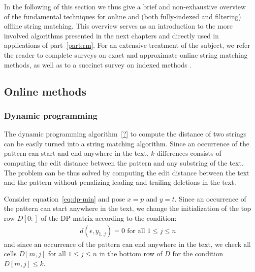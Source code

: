 In the following of this section we thus give a brief and non-exhaustive overview of the fundamental techniques for online and (both fully-indexed and filtering) offline string matching.
This overview serves as an introduction to the more involved algorithms presented in the next chapters and directly used in applications of part~\ref{part:rm}.
For an extensive treatment of the subject, we refer the reader to complete surveys on exact \citep{Faro2013} and approximate \citep{Navarro2001b} online string matching methods, as well as to a succinct survey on indexed methods \citep{Navarro2001}.


\subsection{Online methods}
\label{sub:introonline}


%
%
%

\subsubsection{Dynamic programming}


The dynamic programming algorithm~\ref{?} to compute the distance of two strings can be easily turned into a string matching algorithm.
Since an occurrence of the pattern can start and end anywhere in the text, $k$-differences consists of computing the edit distance between the pattern and any substring of the text.
The problem can be thus solved by computing the edit distance between the text and the pattern without penalizing leading and trailing deletions in the text.

Consider equation~\ref{eq:dp-min} and pose $x=p$ and $y=t$.
Since an occurrence of the pattern can start anywhere in the text, we change the initialization of the top row $D[0:]$ of the DP matrix according to the condition:
\begin{eqnarray}
d(\epsilon, y_{1..j}) = 0 \text{ for all } 1 \leq j \leq n
\end{eqnarray}
and since an occurrence of the pattern can end anywhere in the text, we check all cells $D[m,j]$ for all $1 \leq j \leq n$ in the bottom row of $D$ for the condition $D[m,j] \leq k$.

